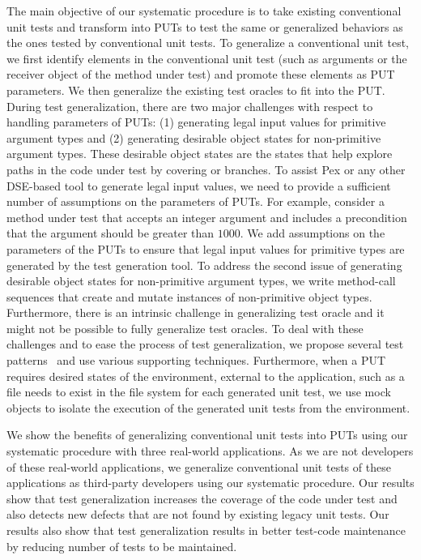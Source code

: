 The main objective of our systematic procedure is to take existing conventional unit tests and transform into PUTs to test the same or generalized behaviors as the ones tested by  conventional unit tests. To generalize a conventional unit test, we first identify elements in the conventional unit test (such as arguments or the receiver object of the method under test) and promote these elements as PUT parameters. We then generalize the existing test oracles to fit into the PUT. During test generalization, there are two major challenges with respect to handling parameters of PUTs: (1) generating legal input values for primitive argument types and (2) generating desirable object states for non-primitive argument types. These desirable object states are the states that help explore paths in the code under test by covering  or  branches. 
To assist Pex or any other DSE-based tool to generate legal input values, we need to provide a sufficient number of assumptions on the parameters of PUTs. For example, consider a method under test that accepts an integer argument and includes a precondition that the argument should be greater than $1000$. We add assumptions on the parameters of the PUTs to ensure that legal input values for primitive types are generated by the test generation tool. To address the second issue of generating desirable object states for non-primitive argument types, we write method-call sequences that create and mutate instances of non-primitive object types. Furthermore, there is an intrinsic challenge in generalizing test oracle and it might not be possible to fully generalize test oracles. To deal with these challenges and to ease the process of test generalization, we propose several test patterns~\cite{halleux08:putpatterns} and use various supporting techniques.  Furthermore, when a PUT requires desired states of the environment, external to the application, such as a file needs to exist in the file system for each generated unit test, we use mock objects to isolate the execution of the generated unit tests from the environment. 

We show the benefits of generalizing conventional unit tests into PUTs using our systematic procedure with three real-world applications. As we are not developers of these real-world applications, we generalize conventional unit tests of these applications as third-party developers using our systematic procedure. Our results show that test generalization increases the coverage of the code under test and also detects new defects that are not found by existing legacy unit tests. Our results also show that test generalization results in better test-code maintenance by reducing number of tests to be maintained. %

